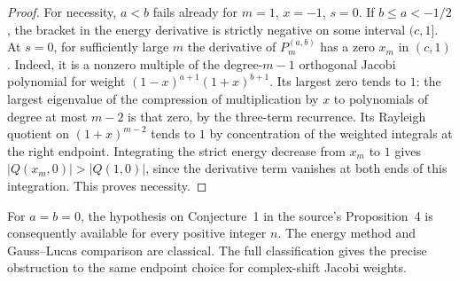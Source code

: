 \documentclass[11pt,a4paper]{article}
\numberwithin{equation}{section}
\begin{document}
\begin{proof}
For necessity, $a<b$ fails already for $m=1$, $x=-1$, $s=0$.
If $b\le a<-1/2$, the bracket in the energy derivative is strictly
negative on some interval $(c,1]$. At $s=0$, for sufficiently large
$m$ the derivative of $P_m^{(a,b)}$ has a zero $x_m$ in $(c,1)$.
Indeed, it is a nonzero multiple of the degree-$m-1$ orthogonal
Jacobi polynomial for weight $(1-x)^{a+1}(1+x)^{b+1}$. Its largest
zero tends to $1$: the largest eigenvalue of the compression of
multiplication by $x$ to polynomials of degree at most $m-2$ is
that zero, by the three-term recurrence. Its Rayleigh quotient on
$(1+x)^{m-2}$ tends to $1$ by concentration of the weighted integrals
at the right endpoint. Integrating the strict energy decrease from
$x_m$ to $1$ gives $|Q(x_m,0)|>|Q(1,0)|$, since the derivative
term vanishes at both ends of this integration. This proves necessity.
\end{proof}
For $a=b=0$, the hypothesis on Conjecture~1 in the source's
Proposition~4 is consequently available for every positive integer
$n$. The energy method and Gauss--Lucas comparison are classical.
The full classification gives the precise obstruction to the same
endpoint choice for complex-shift Jacobi weights.
\end{document}
